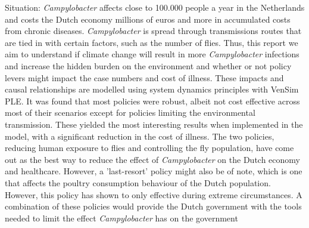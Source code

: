 
Situation: \textit{Campylobacter} affects close to 100.000 people a year in the Netherlands and costs the Dutch economy millions of euros and more in accumulated costs from chronic diseases. \textit{Campylobacter} is spread through transmissions routes that are tied in with certain factors, such as the number of flies. Thus, this report we aim to understand if climate change will result in more \textit{Campylobacter} infections and increase the hidden burden on the environment and whether or not policy levers might impact the case numbers and cost of illness. These impacts and causal relationships are modelled using system dynamics principles with VenSim PLE.  It was found that most policies were robust, albeit not cost effective across most of their scenarios  except for policies limiting the environmental transmission. These yielded the most interesting results when implemented in the model, with a significant reduction in the cost of illness. The two policies, reducing human exposure to flies and controlling the fly population, have come out as the best way to reduce the effect of \textit{Campylobacter} on the Dutch economy and healthcare. However, a 'last-resort' policy might also be of note, which is one that affects the poultry consumption behaviour of the Dutch population. However, this policy has shown to only effective during extreme circumstances. A combination of these policies would provide the Dutch government with the tools needed to limit the effect \textit{Campylobacter} has on the government


